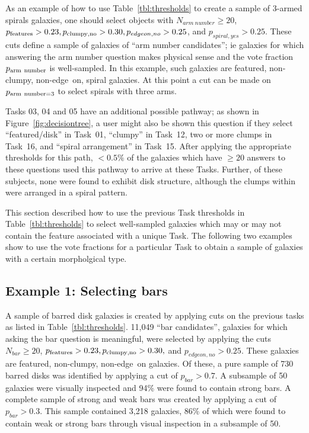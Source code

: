 \documentclass[twocolumn]{aastex6}
\begin{document}
As an example of how to use Table~\ref{tbl:thresholds} to create a sample of 3-armed spirals galaxies, one should select objects with $N_{arm~number} \ge 20$, $p_{\rm features}>0.23, p_{\rm clumpy,no} > 0.30, p_{edgeon,no}>0.25$, and $p_{spiral,yes}>0.25$. These cuts define a sample of galaxies of ``arm number candidates''; ie galaxies for which answering the arm number question makes physical sense and the vote fraction $p_{\rm arm~number}$ is well-sampled. In this example, such galaxies are featured, non-clumpy, non-edge~on, spiral galaxies. At this point a cut can be made on $p_{\rm arm~number=3}$ to select spirals with three arms. 

Tasks 03, 04 and 05 have an additional possible pathway; as shown in Figure~\ref{fig:decisiontree}, a user might also be shown this question if they select ``featured/disk'' in Task~01, ``clumpy'' in Task~12, two or more clumps in Task~16, and ``spiral arrangement'' in Task~15. After applying the appropriate thresholds for this path, $< 0.5\%$ of the galaxies which have $\ge 20$ answers to these questions used this pathway to arrive at these Tasks. Further, of these subjects, none were found to exhibit disk structure, although the clumps within were arranged in a spiral pattern. 

This section described how to use the previous Task thresholds in Table~\ref{tbl:thresholds} to select well-sampled galaxies which may or may not contain the feature associated with a unique Task. The following two examples show to use the vote fractions for a particular Task to obtain a sample of galaxies with a certain morpholgical type.

\subsection{Example 1: Selecting bars} 

A sample of barred disk galaxies is created by applying cuts on the previous tasks as listed in Table~\ref{tbl:thresholds}. 11,049 ``bar candidates'', galaxies for which asking the bar question is meaningful, were selected by applying the cuts $N_{bar} \ge 20$, $p_{\rm features}>0.23, p_{\rm clumpy,no} > 0.30,$ and $p_{edgeon,no}>0.25$. These galaxies are featured, non-clumpy, non-edge~on galaxies. Of these, a pure sample of 730 barred disks was identified by applying a cut of $p_{bar}>0.7$. A subsample of 50 galaxies were visually inspected and 94\% were found to contain strong bars. A complete sample of strong and weak bars was created by applying a cut of $p_{bar}>0.3$. This sample contained 3,218 galaxies, 86\% of which were found to contain weak or strong bars through visual inspection in a subsample of 50.
\end{document}
